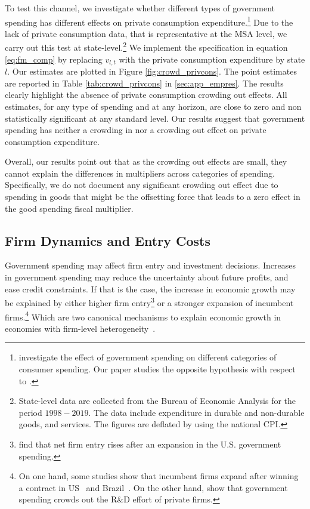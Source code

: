 \documentclass[dv_diss_main.tex]{subfiles}
\begin{document}
To test this channel, we investigate whether different types of government spending has different effects on private consumption expenditure.\footnote{\cite{Dupor2021} investigate the effect of government spending on different categories of consumer spending. Our paper studies the opposite hypothesis with respect to \cite{Dupor2021}.} Due to the lack of private consumption data, that is representative at the MSA level, we carry out this test at state-level.\footnote{State-level data are collected from the Bureau of Economic Analysis for the period $1998-2019$. The data include expenditure in durable and non-durable goods, and services. The figures are deflated by using the national CPI.} We implement the specification in equation \eqref{eq:fm_comp} by replacing $v_{l,t}$ with the private consumption expenditure by state $l$. Our estimates are plotted in Figure \ref{fig:crowd_privcons}. The point estimates are reported in Table \ref{tab:crowd_privcons} in \ref{sec:app_empres}. The results clearly highlight the absence of private consumption crowding out effects. All estimates, for any type of spending and at any horizon, are close to zero and non statistically significant at any standard level. Our results suggest that government spending has neither a crowding in nor a crowding out effect on private consumption expenditure.

Overall, our results point out that as the crowding out effects are small, they cannot explain the differences in multipliers across categories of spending. Specifically, we do not document any significant crowding out effect due to spending in goods that might be the offsetting force that leads to a zero effect in the good spending fiscal multiplier. 

\subsection{Firm Dynamics and Entry Costs}\label{subsec:bus_dyn}


Government spending may affect firm entry and investment decisions. Increases in government spending may reduce the uncertainty about future profits, and ease credit constraints. If that is the case, the increase in economic growth may be explained by either higher firm entry\footnote{\cite{Lewis2017} find that net firm entry rises after an expansion in the U.S. government spending.} or a stronger expansion of incumbent firms.\footnote{On one hand, some studies show that incumbent firms expand after winning a contract in US~\citep{Juarros2021} and Brazil~\citep{Ferraz2015, Lee2021}. On the other hand, \cite{Atanassov2018} show that government spending crowds out the R\&D effort of private firms.} Which are two canonical mechanisms to explain economic growth in economies with firm-level heterogeneity~\citep{Acemoglu2018}.
\end{document}
